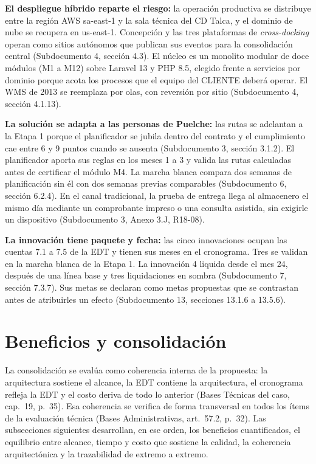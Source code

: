 \textbf{El despliegue híbrido reparte el riesgo:} la operación productiva se distribuye entre la región AWS sa-east-1 y la sala técnica del CD Talca, y el dominio de nube se recupera en us-east-1. Concepción y las tres plataformas de \emph{cross-docking} operan como sitios autónomos que publican sus eventos para la consolidación central (Subdocumento 4, sección 4.3). El núcleo es un monolito modular de doce módulos (M1 a M12) sobre Laravel 13 y PHP 8.5, elegido frente a servicios por dominio porque acota los procesos que el equipo del CLIENTE deberá operar. El WMS de 2013 se reemplaza por olas, con reversión por sitio (Subdocumento 4, sección 4.1.13).

\textbf{La solución se adapta a las personas de Puelche:} las rutas se adelantan a la Etapa 1 porque el planificador se jubila dentro del contrato y el cumplimiento cae entre 6 y 9 puntos cuando se ausenta (Subdocumento 3, sección 3.1.2). El planificador aporta sus reglas en los meses 1 a 3 y valida las rutas calculadas antes de certificar el módulo M4. La marcha blanca compara dos semanas de planificación sin él con dos semanas previas comparables (Subdocumento 6, sección 6.2.4). En el canal tradicional, la prueba de entrega llega al almacenero el mismo día mediante un comprobante impreso o una consulta asistida, sin exigirle un dispositivo (Subdocumento 3, Anexo 3.J, R18-08).

\textbf{La innovación tiene paquete y fecha:} las cinco innovaciones ocupan las cuentas 7.1 a 7.5 de la EDT y tienen sus meses en el cronograma. Tres se validan en la marcha blanca de la Etapa 1. La innovación 4 liquida desde el mes 24, después de una línea base y tres liquidaciones en sombra (Subdocumento 7, sección 7.3.7). Sus metas se declaran como metas propuestas que se contrastan antes de atribuirles un efecto (Subdocumento 13, secciones 13.1.6 a 13.5.6).

\section{Beneficios y consolidación}

La consolidación se evalúa como coherencia interna de la propuesta: la arquitectura sostiene el alcance, la EDT contiene la arquitectura, el cronograma refleja la EDT y el costo deriva de todo lo anterior (Bases Técnicas del caso, cap.~19, p.~35). Esa coherencia se verifica de forma transversal en todos los ítems de la evaluación técnica (Bases Administrativas, art.~57.2, p.~32). Las subsecciones siguientes desarrollan, en ese orden, los beneficios cuantificados, el equilibrio entre alcance, tiempo y costo que sostiene la calidad, la coherencia arquitectónica y la trazabilidad de extremo a extremo.

